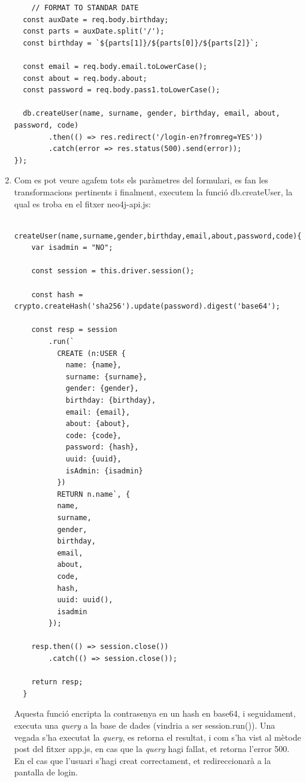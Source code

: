 \documentclass[11pt,catalan,listoffigures,listoftables]{tfgetsinf}
\begin{document}
\begin{enumerate}
\begin{lstlisting}
    // FORMAT TO STANDAR DATE
  const auxDate = req.body.birthday;
  const parts = auxDate.split('/');
  const birthday = `${parts[1]}/${parts[0]}/${parts[2]}`;

  const email = req.body.email.toLowerCase();
  const about = req.body.about;
  const password = req.body.pass1.toLowerCase();

  db.createUser(name, surname, gender, birthday, email, about, password, code)
        .then(() => res.redirect('/login-en?fromreg=YES'))
        .catch(error => res.status(500).send(error));
});
\end{lstlisting}
\item Com es pot veure agafem tots els paràmetres del formulari, es fan les transformacions pertinents i finalment, executem la funció db.createUser, la qual es troba en el fitxer neo4j-api.js:
\begin{lstlisting}
  createUser(name,surname,gender,birthday,email,about,password,code){
    var isadmin = "NO";

    const session = this.driver.session();

    const hash = crypto.createHash('sha256').update(password).digest('base64');

    const resp = session
        .run(`
          CREATE (n:USER {
            name: {name},
            surname: {surname},
            gender: {gender},
            birthday: {birthday},
            email: {email},
            about: {about},
            code: {code},
            password: {hash},
            uuid: {uuid},
            isAdmin: {isadmin}
          })
          RETURN n.name`, {
          name,
          surname,
          gender,
          birthday,
          email,
          about,
          code,
          hash,
          uuid: uuid(),
          isadmin
        });

    resp.then(() => session.close())
        .catch(() => session.close());

    return resp;
  }
\end{lstlisting}
Aquesta funció encripta la contrasenya en un hash en base64, i seguidament, executa una \textit{query} a la base de dades (vindria a ser session.run()). Una vegada s'ha executat la \textit{query}, es retorna el resultat, i com s'ha vist al mètode post del fitxer app.js, en cas que la \textit{query} hagi fallat, et retorna l'error 500. En el cas que l'usuari s'hagi creat correctament, et redireccionarà a la pantalla de login.
\end{enumerate}
\end{document}

